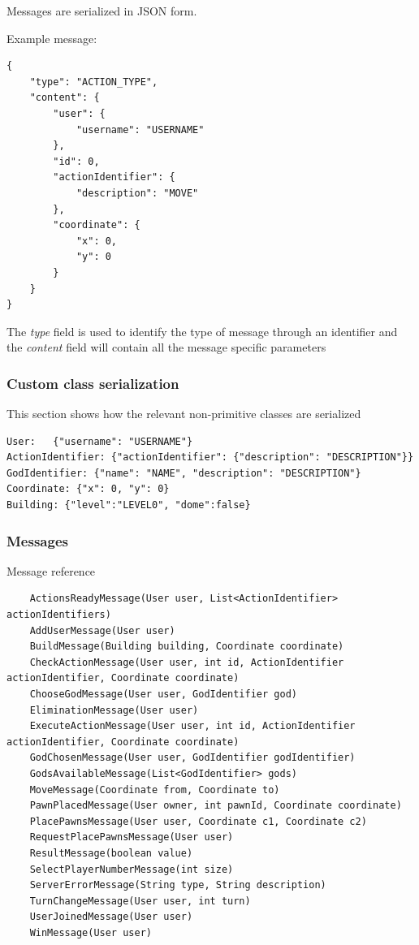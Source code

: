 \documentclass{article}
\begin{document}
Messages are serialized in JSON form.

\vspace{8pt}

Example message:
\begin{lstlisting}
{
    "type": "ACTION_TYPE",
    "content": {
        "user": {
            "username": "USERNAME"
        },
        "id": 0,
        "actionIdentifier": {
            "description": "MOVE"
        },
        "coordinate": {
            "x": 0,
            "y": 0
        }
    }
}
\end{lstlisting}

The \emph{type} field is used to identify the type of message through an identifier and the \emph{content} field will contain all the message specific parameters

\subsubsection*{Custom class serialization}

This section shows how the relevant non-primitive classes are serialized
\begin{lstlisting}
User:	{"username": "USERNAME"}
ActionIdentifier: {"actionIdentifier": {"description": "DESCRIPTION"}}
GodIdentifier: {"name": "NAME", "description": "DESCRIPTION"}
Coordinate: {"x": 0, "y": 0}
Building: {"level":"LEVEL0", "dome":false}
\end{lstlisting}

\subsubsection*{Messages}
Message reference
\begin{lstlisting}
    ActionsReadyMessage(User user, List<ActionIdentifier> actionIdentifiers)
    AddUserMessage(User user)
    BuildMessage(Building building, Coordinate coordinate)
    CheckActionMessage(User user, int id, ActionIdentifier actionIdentifier, Coordinate coordinate)
    ChooseGodMessage(User user, GodIdentifier god)
    EliminationMessage(User user)
    ExecuteActionMessage(User user, int id, ActionIdentifier actionIdentifier, Coordinate coordinate)
    GodChosenMessage(User user, GodIdentifier godIdentifier)
    GodsAvailableMessage(List<GodIdentifier> gods)
    MoveMessage(Coordinate from, Coordinate to)
    PawnPlacedMessage(User owner, int pawnId, Coordinate coordinate)
    PlacePawnsMessage(User user, Coordinate c1, Coordinate c2)
    RequestPlacePawnsMessage(User user)
    ResultMessage(boolean value)
    SelectPlayerNumberMessage(int size)
    ServerErrorMessage(String type, String description)
    TurnChangeMessage(User user, int turn)
    UserJoinedMessage(User user)
    WinMessage(User user)
\end{lstlisting}
\end{document}
